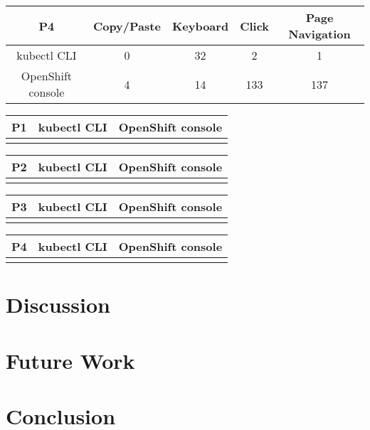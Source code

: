 \documentclass[11pt, oneside]{article}   	%
\begin{document}
\begin{center}
\begin{tabular}{ | c | c | c | c | c | } 
  \hline
  P4 & Copy/Paste & Keyboard & Click & Page Navigation \\ 
  \hline
  kubectl CLI & 0 & 32 & 2 & 1 \\ 
  \hline
  OpenShift console & 4 & 14 & 133 & 137 \\ 
  \hline
\end{tabular}
\end{center}

\begin{center}
\begin{tabular}{ | c | c | c | } 
  \hline
  P1 & kubectl CLI & OpenShift console \\ 
  \hline
   &  &  \\ 
  \hline
\end{tabular}
\end{center}

\begin{center}
\begin{tabular}{ | c | c | c | } 
  \hline
  P2 & kubectl CLI & OpenShift console \\ 
  \hline
   &  &  \\ 
  \hline
\end{tabular}
\end{center}

\begin{center}
\begin{tabular}{ | c | c | c | } 
  \hline
  P3 & kubectl CLI & OpenShift console \\ 
  \hline
   &  &  \\ 
  \hline
\end{tabular}
\end{center}

\begin{center}
\begin{tabular}{ | c | c | c | } 
  \hline
  P4 & kubectl CLI & OpenShift console \\ 
  \hline
   &  &  \\ 
  \hline
\end{tabular}
\end{center}

\section{Discussion}

\section{Future Work}

\section{Conclusion}



\end{document}
